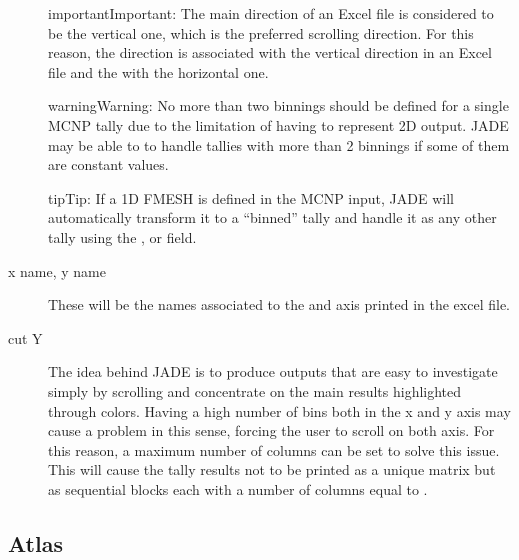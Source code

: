 \documentclass[letterpaper,10pt,english]{sphinxmanual}
\let\sphinxpxdimen\pdfpxdimen\else\newdimen\sphinxpxdimen
\begin{document}
\begin{description}
\begin{sphinxadmonition}{important}{Important:}
The main direction of an Excel file is considered to be the vertical one, which is the preferred scrolling direction.
For this reason, the  direction is associated with the vertical direction in an Excel file and the  with
the horizontal one.
\end{sphinxadmonition}

\begin{sphinxadmonition}{warning}{Warning:}
No more than two binnings should be defined for a single MCNP tally due to the limitation of having to represent
2\sphinxhyphen{}D output. JADE may be able to to handle tallies with more than 2 binnings if some of them are constant
values.
\end{sphinxadmonition}

\begin{sphinxadmonition}{tip}{Tip:}
If a 1D FMESH is defined in the MCNP input, JADE will automatically transform it to a “binned” tally and handle it
as any other tally using the ,  or  field.
\end{sphinxadmonition}

\item[{x name, y name}] \leavevmode
These will be the names associated to the  and  axis printed in the excel file.

\item[{cut Y}] \leavevmode
The idea behind JADE is to produce outputs that are easy to investigate simply by scrolling and concentrate on the
main results highlighted through colors. Having a high number of bins both in the x and y axis may cause a problem
in this sense, forcing the user to scroll on both axis. For this reason, a maximum number of columns can be set to
solve this issue. This will cause the tally results not to be printed as a unique matrix but as sequential blocks
each with a number of columns equal to .

\end{description}


\subsection{Atlas}
\label{\detokenize{usage/configuration:atlas}}
\noindent\sphinxincludegraphics[width=600\sphinxpxdimen]{{atlasbench}.png}
\end{document}
